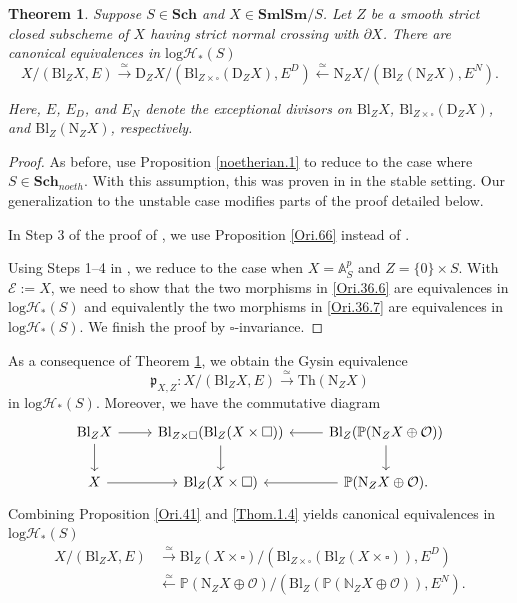 \documentclass[11pt, a4paper]{amsart}
\newtheorem{thm}{Theorem}[subsection]
\theoremstyle{definition}
\numberwithin{equation}{subsection}
\newcommand{\N}{\mathbb{N}}
\renewcommand{\P}{\mathbb{P}}
\newcommand{\A}{\mathbb{A}}
\newcommand{\Sch}{\mathbf{Sch}}
\newcommand{\SmlSm}{\mathbf{SmlSm}}
\newcommand{\Blow}{{\mathrm{Bl}}}
\newcommand{\Normal}{{\mathrm{N}}}
\newcommand{\Deform}{{\mathrm{D}}}
\newcommand{\Thom}{\mathrm{Th}}
\newcommand{\cE}{\mathcal{E}}
\newcommand{\cO}{\mathcal{O}}
\newcommand{\boxx}{\square}
\newcommand{\inflogHpt}{\mathrm{log}\mathcal{H}_\ast}
\begin{document}
\begin{thm}
\label{Thom.1}
Suppose $S\in \Sch$ and $X\in \SmlSm/S$. Let $Z$ be a smooth strict closed subscheme of $X$ having strict normal crossing with $\partial X$.
There are canonical equivalences in $\inflogHpt(S)$
\begin{equation}
\label{Thom.1.4}
X/(\Blow_Z X,E)
\xrightarrow{\simeq}
\Deform_Z X/(\Blow_{Z\times \boxx}(\Deform_Z X),E^D)
\xleftarrow{\simeq}
\Normal_Z X/(\Blow_Z (\Normal_Z X),E^N).
\end{equation}
 
Here, $E$, $E_D$, and $E_N$ denote the exceptional divisors on $\Blow_Z X$, 
$\Blow_{Z\times \boxx}(\Deform_Z X)$, 
and $\Blow_Z (\Normal_Z X)$, 
respectively.
\end{thm}
\begin{proof}
As before,
use Proposition \ref{noetherian.1} to reduce to the case where $S\in \Sch_{noeth}$.
With this assumption,
this was proven in \cite[Theorem 7.5.4]{logDM} in the stable setting.
Our generalization to the unstable case modifies parts of the proof detailed below.

In Step 3 of the proof of \cite[Theorem 7.5.4]{logDM}, 
we use Proposition \ref{Ori.66} instead of \cite[Proposition 7.4.2]{logDM}.

Using Steps 1--4 in \cite[Theorem 7.5.4]{logDM}, we reduce to the case when $X=\A_S^p$ and $Z=\{0\}\times S$.
With $\cE:=X$,
we need to show that the two morphisms in \eqref{Ori.36.6} are equivalences in $\inflogHpt(S)$ and equivalently the two morphisms in \eqref{Ori.36.7} are equivalences in $\inflogHpt(S)$.
We finish the proof by $\square$-invariance.
\end{proof}

As a consequence of Theorem \ref{Thom.1}, 
we obtain the Gysin equivalence
\begin{equation}
\label{Thom.1.5}
\mathfrak{p}_{X,Z}
\colon
 X/(\Blow_Z X,E)
\xrightarrow{\simeq}
\Thom(\Normal_Z X)
\end{equation}
in $\inflogHpt(S)$.
Moreover, we have the commutative diagram
\begin{equation}
\label{THom.1.10}
\begin{tikzcd}
\Blow_Z X\ar[r]\ar[d]&
\Blow_{Z\times \boxx}(\Blow_Z (X\times \boxx))\ar[d]\ar[r,leftarrow]&
\Blow_Z(\P(\Normal_Z X\oplus \cO))\ar[d]
\\
X\ar[r]&
\Blow_Z (X\times \boxx)\ar[r,leftarrow]&
\P(\Normal_Z X\oplus \cO).
\end{tikzcd}
\end{equation}
Combining Proposition \ref{Ori.41} and \eqref{Thom.1.4} yields canonical equivalences in $\inflogHpt(S)$
\begin{equation}
\label{Thom.1.9}
\begin{split}
 X/(\Blow_Z X,E)
&\xrightarrow{\simeq}
 \Blow_Z(X\times \boxx)/(\Blow_{Z\times \boxx}(\Blow_Z (X\times \boxx)),E^D)
\\
&\xleftarrow{\simeq}
 \P(\Normal_Z X\oplus \cO)/(\Blow_Z(\P(\N_Z X\oplus \cO)),E^N).
\end{split}
\end{equation}
\end{document}
